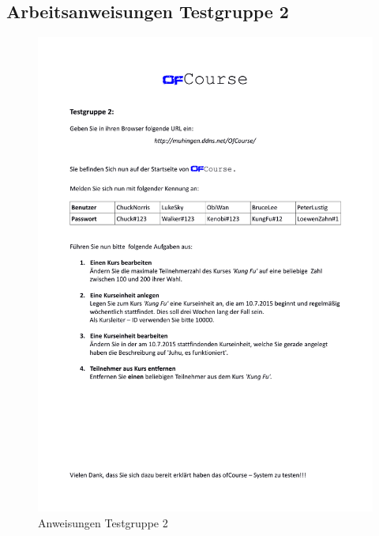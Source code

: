 \subsection*{Arbeitsanweisungen Testgruppe 2}
\begin{figure}[h]
	\centering
	\includegraphics[width=0.9\linewidth, page=1]{pdf/AnweisungenTestgruppe2}		\caption{Anweisungen Testgruppe 2}
	\label{fig:Anweisungen2}
\end{figure}
